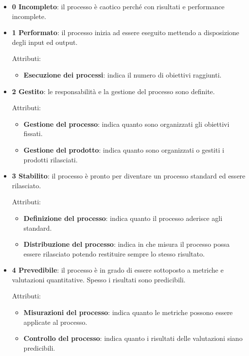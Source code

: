 	\begin{itemize}
		\item \textbf{0 Incompleto}: il processo è caotico perché con risultati e performance incomplete.

		\item \textbf{1 Performato}: il processo inizia ad essere eseguito mettendo a disposizione degli input ed output.

		Attributi:

		\begin{itemize}
			\item \textbf{Esecuzione dei processi}: indica il numero di obiettivi raggiunti.
		\end{itemize}

		\item \textbf{2 Gestito}: le responsabilità e la gestione del processo sono definite.

		Attributi:

		\begin{itemize}
			\item \textbf{Gestione del processo}: indica quanto sono organizzati gli obiettivi fissati.
			\item \textbf{Gestione del prodotto}: indica quanto sono organizzati o gestiti i prodotti rilasciati.
		\end{itemize}

		\item \textbf{3 Stabilito}: il processo è pronto per diventare un processo standard ed essere rilasciato.

		Attributi:

		\begin{itemize}
			\item \textbf{Definizione del processo}: indica quanto il processo aderisce agli standard.
			\item \textbf{Distribuzione del processo}: indica in che misura il processo possa essere rilasciato potendo restituire sempre lo stesso risultato.
		\end{itemize}

		\item \textbf{4 Prevedibile}: il processo è in grado di essere sottoposto a metriche e valutazioni quantitative. Spesso i risultati sono predicibili.

		Attributi:

		\begin{itemize}
			\item \textbf{Misurazioni del processo}: indica quanto le metriche possono essere applicate al processo.
			\item \textbf{Controllo del processo}: indica quanto i risultati delle valutazioni siano predicibili.
		\end{itemize}


\end{itemize}
